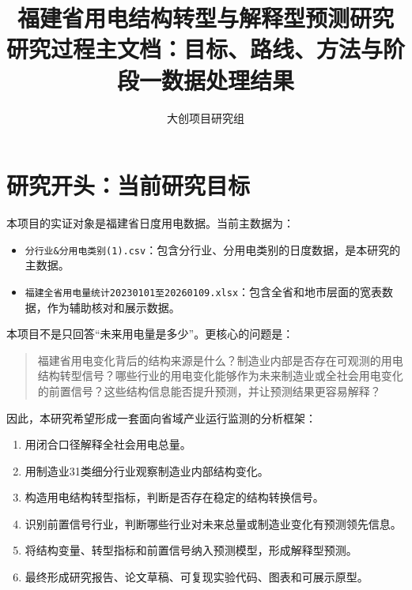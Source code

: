 \documentclass[UTF8,a4paper,11pt]{ctexart}
\title{\heiti 福建省用电结构转型与解释型预测研究\\
\large 研究过程主文档：目标、路线、方法与阶段一数据处理结果}
\author{大创项目研究组}
\date{\projectdate}
\begin{document}
\maketitle

\begin{center}
\end{center}

\tableofcontents
\newpage

\section{研究开头：当前研究目标}

本项目的实证对象是福建省日度用电数据。当前主数据为：
\begin{itemize}
  \item \texttt{分行业\&分用电类别(1).csv}：包含分行业、分用电类别的日度数据，是本研究的主数据。
  \item \texttt{福建全省用电量统计20230101至20260109.xlsx}：包含全省和地市层面的宽表数据，作为辅助核对和展示数据。
\end{itemize}

本项目不是只回答“未来用电量是多少”。更核心的问题是：

\begin{quote}
福建省用电变化背后的结构来源是什么？制造业内部是否存在可观测的用电结构转型信号？哪些行业的用电变化能够作为未来制造业或全社会用电变化的前置信号？这些结构信息能否提升预测，并让预测结果更容易解释？
\end{quote}

因此，本研究希望形成一套面向省域产业运行监测的分析框架：

\begin{enumerate}
  \item 用闭合口径解释全社会用电总量。
  \item 用制造业31类细分行业观察制造业内部结构变化。
  \item 构造用电结构转型指标，判断是否存在稳定的结构转换信号。
  \item 识别前置信号行业，判断哪些行业对未来总量或制造业变化有预测领先信息。
  \item 将结构变量、转型指标和前置信号纳入预测模型，形成解释型预测。
  \item 最终形成研究报告、论文草稿、可复现实验代码、图表和可展示原型。
\end{enumerate}
\end{document}
